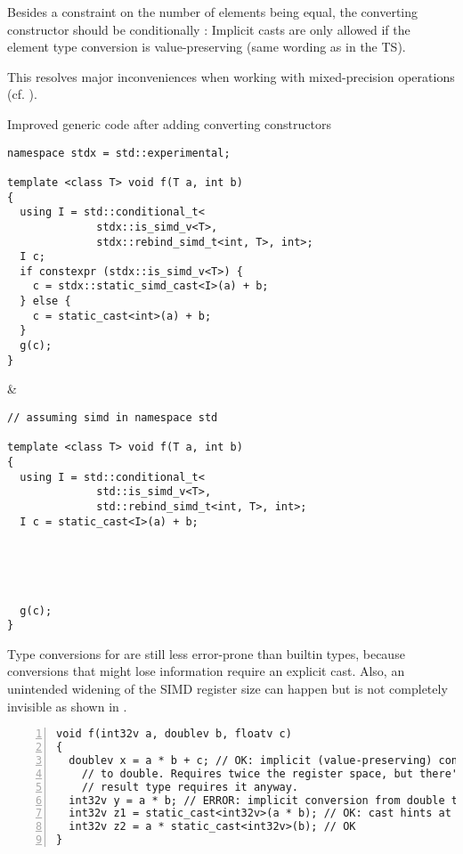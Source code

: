 Besides a constraint on the number of elements being equal, the converting
constructor should be conditionally :
Implicit casts are only allowed if the element type conversion is
value-preserving (same wording as in the TS).

This resolves major inconveniences when working with mixed-precision
operations (cf. ).
\begin{tonytable}{Improved generic code after adding converting constructors}\label{tt:better with conv ctors}
  \begin{lstlisting}
namespace stdx = std::experimental;

template <class T> void f(T a, int b)
{
  using I = std::conditional_t<
              stdx::is_simd_v<T>,
              stdx::rebind_simd_t<int, T>, int>;
  I c;
  if constexpr (stdx::is_simd_v<T>) {
    c = stdx::static_simd_cast<I>(a) + b;
  } else {
    c = static_cast<int>(a) + b;
  }
  g(c);
}
  \end{lstlisting}
  &
  \begin{lstlisting}
// assuming simd in namespace std

template <class T> void f(T a, int b)
{
  using I = std::conditional_t<
              std::is_simd_v<T>,
              std::rebind_simd_t<int, T>, int>;
  I c = static_cast<I>(a) + b;





  g(c);
}
  \end{lstlisting}
\end{tonytable}%
Type conversions for  are still less error-prone than builtin types,
because conversions that might lose information require an explicit cast.
Also, an unintended widening of the SIMD register size can happen but is not
completely invisible as shown in .

\begin{lstlisting}[numbers=left,float={hbtp},label=lst:mixedprecision,caption={
  Mixed precision code using the types from \lst{lst:simdtypespattern}, ensuring equal element count
}]
void f(int32v a, doublev b, floatv c)
{
  doublev x = a * b + c; // OK: implicit (value-preserving) conversion from int and float
    // to double. Requires twice the register space, but there's no way around it and the
    // result type requires it anyway.
  int32v y = a * b; // ERROR: implicit conversion from double to int not value-preserving
  int32v z1 = static_cast<int32v>(a * b); // OK: cast hints at implicit register widening
  int32v z2 = a * static_cast<int32v>(b); // OK
}
\end{lstlisting}


